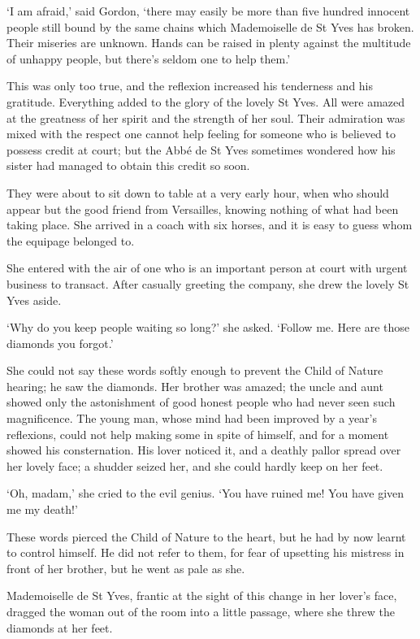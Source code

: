\documentclass{article}
\begin{document}
\begin{center}
`I am afraid,' said Gordon, `there may easily be more than five hundred innocent 
people still bound by the same chains which Mademoiselle de St Yves has broken. 
Their miseries are unknown. Hands can be raised in plenty against the multitude 
of unhappy people, but there's seldom one to help them.' 

This was only too true, and the reflexion increased his tenderness and his gratitude. 
Everything added to the glory of the lovely St Yves. All were amazed at the greatness 
of her spirit and the strength of her soul. Their admiration was mixed with the 
respect one cannot help feeling for someone who is believed to possess credit at 
court; but the Abbé de St Yves sometimes wondered how his sister had managed to 
obtain this credit so soon. 

They were about to sit down to table at a very early hour, when who should appear 
but the good friend from Versailles, knowing nothing of what had been taking place. 
She arrived in a coach with six horses, and it is easy to guess whom the equipage 
belonged to. 

She entered with the air of one who is an important person at court with urgent 
business to transact. After casually greeting the company, she drew the lovely 
St Yves aside. 

`Why do you keep people waiting so long?' she asked. `Follow me. Here are those 
diamonds you forgot.' 

She could not say these words softly enough to prevent the Child of Nature hearing; 
he saw the diamonds. Her brother was amazed; the uncle and aunt showed only the 
astonishment of good honest people who had never seen such magnificence. The young 
man, whose mind had been improved by a year's reflexions, could not help making 
some in spite of himself, and for a moment showed his consternation. His lover 
noticed it, and a deathly pallor spread over her lovely face; a shudder seized 
her, and she could hardly keep on her feet. 

`Oh, madam,' she cried to the evil genius. `You have ruined me! You have given 
me my death!' 

These words pierced the Child of Nature to the heart, but he had by now learnt 
to control himself. He did not refer to them, for fear of upsetting his mistress 
in front of her brother, but he went as pale as she. 

Mademoiselle de St Yves, frantic at the sight of this change in her lover's face, 
dragged the woman out of the room into a little passage, where she threw the diamonds 
at her feet. 


\end{center}
\end{document}
